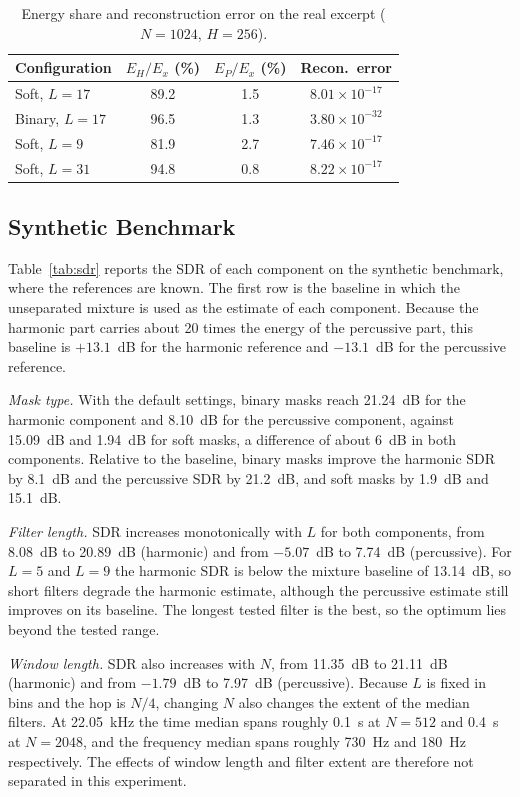 \documentclass[conference]{IEEEtran}
\begin{document}
\begin{table}[t]
\centering
\caption{Energy share and reconstruction error on the real excerpt ($N=1024$, $H=256$). }
\label{tab:real}
\begin{tabular}{lccc}
\toprule
Configuration & $E_H/E_x$ (\%) & $E_P/E_x$ (\%) & Recon.\ error\\
\midrule
Soft, $L=17$ & 89.2 & 1.5 & $8.01\times10^{-17}$\\
Binary, $L=17$ & 96.5 & 1.3 & $3.80\times10^{-32}$\\
Soft, $L=9$ & 81.9 & 2.7 & $7.46\times10^{-17}$\\
Soft, $L=31$ & 94.8 & 0.8 & $8.22\times10^{-17}$\\
\bottomrule
\end{tabular}
\end{table}

\subsection{Synthetic Benchmark}
Table~\ref{tab:sdr} reports the SDR of each component on the synthetic benchmark, where the references are known. The first row is the baseline in which the unseparated mixture is used as the estimate of each component. Because the harmonic part carries about 20 times the energy of the percussive part, this baseline is $+13.1$~dB for the harmonic reference and $-13.1$~dB for the percussive reference.

\emph{Mask type.} With the default settings, binary masks reach 21.24~dB for the harmonic component and 8.10~dB for the percussive component, against 15.09~dB and 1.94~dB for soft masks, a difference of about 6~dB in both components. Relative to the baseline, binary masks improve the harmonic SDR by 8.1~dB and the percussive SDR by 21.2~dB, and soft masks by 1.9~dB and 15.1~dB.

\emph{Filter length.} SDR increases monotonically with $L$ for both components, from 8.08~dB to 20.89~dB (harmonic) and from $-5.07$~dB to 7.74~dB (percussive). For $L=5$ and $L=9$ the harmonic SDR is below the mixture baseline of 13.14~dB, so short filters degrade the harmonic estimate, although the percussive estimate still improves on its baseline. The longest tested filter is the best, so the optimum lies beyond the tested range.

\emph{Window length.} SDR also increases with $N$, from 11.35~dB to 21.11~dB (harmonic) and from $-1.79$~dB to 7.97~dB (percussive). Because $L$ is fixed in bins and the hop is $N/4$, changing $N$ also changes the extent of the median filters. At 22.05~kHz the time median spans roughly 0.1~s at $N=512$ and 0.4~s at $N=2048$, and the frequency median spans roughly 730~Hz and 180~Hz respectively. The effects of window length and filter extent are therefore not separated in this experiment.
\end{document}
